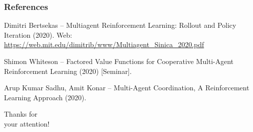 \documentclass{beamer}
\begin{document}
    \begin{frame}
        \frametitle{References}
        \footnotesize{
            \begin{thebibliography}{10}

                \label{bert20}
                Dimitri Bertsekas -- Multiagent Reinforcement Learning: Rollout and Policy Iteration (2020). Web:
                \url{https://web.mit.edu/dimitrib/www/Multiagent_Sinica_2020.pdf}

                \label{whiteson20}
                Shimon Whiteson -- Factored Value Functions for Cooperative Multi-Agent Reinforcement Learning (2020) [Seminar].


                \label{sadhu20}
                Arup Kumar Sadhu, Amit Konar --
                Multi-Agent Coordination,
                A Reinforcement Learning Approach (2020).


            \end{thebibliography}
        }
    \end{frame}


    \begin{frame}

        \begin{center}
            \Huge Thanks for
            \\
            your attention!
        \end{center}

    \end{frame}

\end{document}
